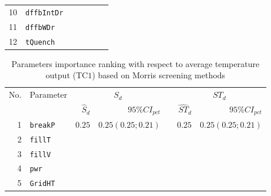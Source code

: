 \begin{table*}[!ht]
\begin{tabular*}{\textwidth}{@{}rlrrrrr@{}}
\footnotesize{10}  & \footnotesize{\texttt{dffbIntDr}}  &                        &                                 &&                         &    \\
\footnotesize{11}  & \footnotesize{\texttt{dffbWDr}}    &                        &                                 &&                         &    \\
\footnotesize{12}  & \footnotesize{\texttt{tQuench}}    &                        &                                 &&                         &    \\
\bottomrule
\end{tabular*}
\end{table*}

 \begin{table*}[!ht]\centering
{}
\caption{Parameters importance ranking with respect to average temperature output (TC$1$) based on Morris screening methods}
\begin{tabular*}{\textwidth}{@{}rlrrrrr@{}}\toprule
\multirow{2}{*}{\footnotesize{No.}}&\multirow{2}{*}{\footnotesize{Parameter}}&\multicolumn{2}{c}{\footnotesize{$S_d$}}&\phantom{a}&\multicolumn{2}{c}{\footnotesize{$ST_d$}}\\             
                                                                              \cmidrule{3-4}                                       \cmidrule{6-7}
                                   &                                         &\footnotesize{$\hat{S}_d$}&\footnotesize{$95\%CI_{pct}$}&&\footnotesize{$\hat{ST}_d$}&\footnotesize{$95\%CI_{pct}$} \\ \midrule
\footnotesize{1}   & \footnotesize{\texttt{breakP}}     &  \footnotesize{$0.25$} &\footnotesize{$0.25 (0.25;0.21)$}&& \footnotesize{$0.25$}   &   \footnotesize{$0.25 (0.25;0.21)$}   \\
\footnotesize{2}   & \footnotesize{\texttt{fillT}}     	&                        &                                 &&                         &    \\
\footnotesize{3}   & \footnotesize{\texttt{fillV}}     	&                        &                                 &&                         &    \\
\footnotesize{4}   & \footnotesize{\texttt{pwr}}       	&                        &                                 &&                         &    \\
\footnotesize{5}   & \footnotesize{\texttt{GridHT}}     &                        &                                 &&                         &    \\

\end{tabular*}
\end{table*}
